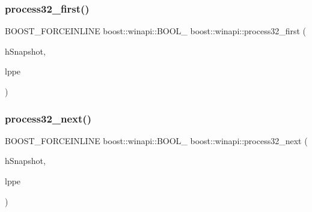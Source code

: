 \mbox{\label{namespaceboost_1_1winapi_a377ad6e592ef538339b1f1f293bb0816}} 
\subsubsection{\texorpdfstring{process32\+\_\+first()}{process32\_first()}}
{\footnotesize\ttfamily B\+O\+O\+S\+T\+\_\+\+F\+O\+R\+C\+E\+I\+N\+L\+I\+NE boost\+::winapi\+::\+B\+O\+O\+L\+\_\+ boost\+::winapi\+::process32\+\_\+first (\begin{DoxyParamCaption}\item[{boost\+::winapi\+::\+H\+A\+N\+D\+L\+E\+\_\+}]{h\+Snapshot,  }\item[{\mbox{\hyperlink{namespaceboost_1_1winapi_aa148b1a2cd4a16c95b05b56d8b31cc4c}{boost\+::winapi\+::\+P\+R\+O\+C\+E\+S\+S\+E\+N\+T\+R\+Y32\+\_\+}} $\ast$}]{lppe }\end{DoxyParamCaption})}

\mbox{\label{namespaceboost_1_1winapi_a931768aa879bcce18336898dedd69efc}} 
\subsubsection{\texorpdfstring{process32\+\_\+next()}{process32\_next()}}
{\footnotesize\ttfamily B\+O\+O\+S\+T\+\_\+\+F\+O\+R\+C\+E\+I\+N\+L\+I\+NE boost\+::winapi\+::\+B\+O\+O\+L\+\_\+ boost\+::winapi\+::process32\+\_\+next (\begin{DoxyParamCaption}\item[{boost\+::winapi\+::\+H\+A\+N\+D\+L\+E\+\_\+}]{h\+Snapshot,  }\item[{\mbox{\hyperlink{namespaceboost_1_1winapi_aa148b1a2cd4a16c95b05b56d8b31cc4c}{boost\+::winapi\+::\+P\+R\+O\+C\+E\+S\+S\+E\+N\+T\+R\+Y32\+\_\+}} $\ast$}]{lppe }\end{DoxyParamCaption})}

\mbox{\label{namespaceboost_1_1winapi_a7ab15fe99afc7fa21e7cbe076b3bb51f}} 
